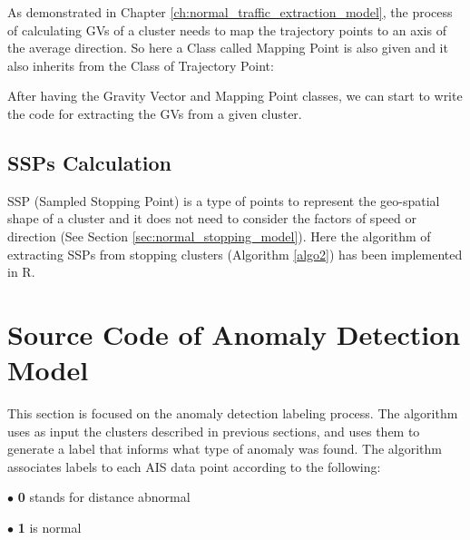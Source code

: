 \documentclass[12pt,glossary]{dalcsthesis}
\begin{document}


As demonstrated in Chapter \ref{ch:normal_traffic_extraction_model}, the process of calculating GVs of a cluster needs to map the trajectory points to an axis of the average direction. So here a Class called Mapping Point is also given and it also inherits from the Class of Trajectory Point:



After having the Gravity Vector and Mapping Point classes, we can start to write the code for extracting the GVs from a given cluster. 



\subsection{SSPs Calculation}

SSP (Sampled Stopping Point) is a type of points to represent the geo-spatial shape of a cluster and it does not need to consider the factors of speed or direction (See Section \ref{sec:normal_stopping_model}). Here the algorithm of extracting SSPs from stopping clusters (Algorithm \ref{algo2}) has been implemented in R.




\section{Source Code of Anomaly Detection Model}
\label{code2}

This section is focused on the anomaly detection labeling process. The algorithm uses as input the clusters described in previous sections, and uses them to generate a label that informs what type of anomaly was found. The algorithm associates labels to each AIS data point according to the following:

$\bullet$ \textbf{0} stands for distance abnormal

$\bullet$ \textbf{1} is normal
\end{document}
